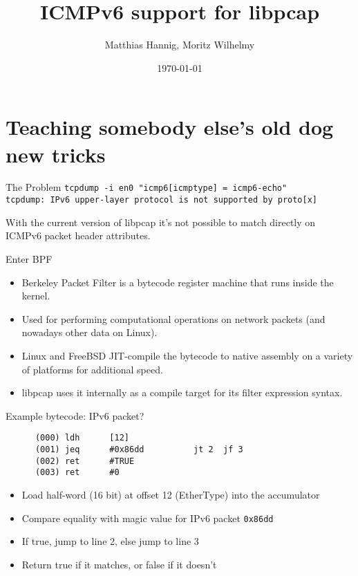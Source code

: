 \documentclass{beamer}
\title{ICMPv6 support for libpcap}
\date{\today}
\author{Matthias Hannig, Moritz Wilhelmy}
\institute{RIPE NCC IPv6 Hackathon Copenhagen}
\begin{document}
  \maketitle
  \section{Teaching somebody else's old dog new tricks}
  \begin{frame}{The Problem}
    \texttt{tcpdump -i en0 "icmp6[icmptype] = icmp6-echo"}\\
    \texttt{tcpdump: IPv6 upper-layer protocol is not supported by proto[x]}

    With the current version of libpcap it's not possible to match directly on ICMPv6 packet header attributes.
  \end{frame}

  \begin{frame}{Enter BPF}
    \begin{itemize}
      \item Berkeley Packet Filter is a bytecode register machine that runs inside the kernel.

      \item Used for performing computational operations on network packets (and nowadays other data on Linux).

      \item Linux and FreeBSD JIT-compile the bytecode to native assembly on a
        variety of platforms for additional speed.

      \item libpcap uses it internally as a compile target for its filter expression syntax.
    \end{itemize}
  \end{frame}

  \begin{frame}[fragile]{Example bytecode: IPv6 packet?}
    \begin{verbatim}
      (000) ldh      [12]
      (001) jeq      #0x86dd          jt 2  jf 3
      (002) ret      #TRUE
      (003) ret      #0
    \end{verbatim}

    \begin{itemize}
      \item Load half-word (16 bit) at offset 12 (EtherType) into the accumulator
      \item Compare equality with magic value for IPv6 packet \texttt{0x86dd}
      \item If true, jump to line 2, else jump to line 3
      \item Return true if it matches, or false if it doesn't
    \end{itemize}
  \end{frame}
\end{document}
